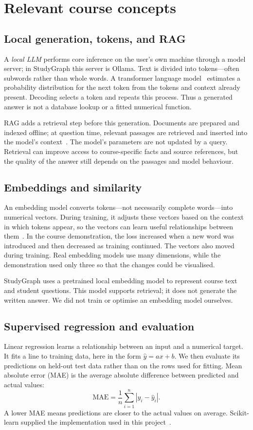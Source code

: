 \section{Relevant course concepts}
\subsection{Local generation, tokens, and RAG}
A \emph{local LLM} performs core inference on the user's own machine through
a model server; in StudyGraph this server is Ollama.
Text is divided into tokens---often subwords rather than whole words.
A transformer language model~\cite{vaswani2017attention} estimates a probability
distribution for the next token from the tokens and context already present.
Decoding selects a token and repeats this process.
Thus a generated answer is not a database lookup or a fitted numerical function.

RAG adds a retrieval step before this generation.
Documents are prepared and indexed offline; at question time, relevant passages
are retrieved and inserted into the model's context~\cite{lewis2020rag}.
The model's parameters are not updated by a query.
Retrieval can improve access to course-specific facts and source references, but
the quality of the answer still depends on the passages and model behaviour.

\subsection{Embeddings and similarity}
An embedding model converts tokens---not necessarily complete words---into numerical vectors.
During training, it adjusts these vectors based on the context in which tokens
appear, so the vectors can learn useful relationships between them~\cite{mikolov2013efficient}.
In the course demonstration, the loss increased when a new word was introduced
and then decreased as training continued.
The vectors also moved during training.
Real embedding models use many dimensions, while the demonstration used only
three so that the changes could be visualised.

StudyGraph uses a pretrained local embedding model to represent course text and student questions.
This model supports retrieval; it does not generate the written answer.
We did not train or optimise an embedding model ourselves.

\subsection{Supervised regression and evaluation}
Linear regression learns a relationship between an input and a numerical target.
It fits a line to training data, here in the form $\hat y=ax+b$.
We then evaluate its predictions on held-out test data rather than on the rows
used for fitting. Mean absolute error (MAE) is the average absolute difference
between predicted and actual values:
\begin{equation}
\mathrm{MAE}=\frac{1}{n}\sum_{i=1}^{n}\left|y_i-\hat y_i\right|.
\end{equation}
A lower MAE means predictions are closer to the actual values on average.
Scikit-learn supplied the implementation used in this project~\cite{pedregosa2011scikit}.

